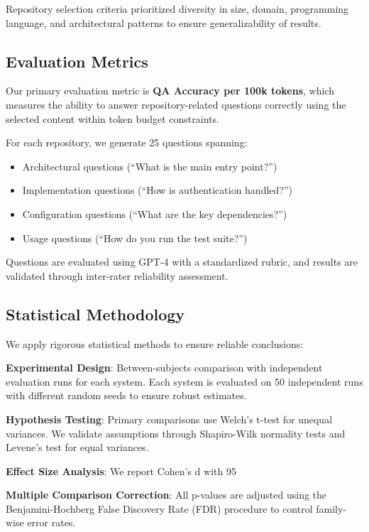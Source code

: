 \documentclass[conference]{IEEEtran}
\begin{document}
Repository selection criteria prioritized diversity in size, domain, programming language, and architectural patterns to ensure generalizability of results.

\subsection{Evaluation Metrics}

Our primary evaluation metric is \textbf{QA Accuracy per 100k tokens}, which measures the ability to answer repository-related questions correctly using the selected content within token budget constraints.

For each repository, we generate 25 questions spanning:
\begin{itemize}
\item Architectural questions (``What is the main entry point?'')
\item Implementation questions (``How is authentication handled?'')
\item Configuration questions (``What are the key dependencies?'')
\item Usage questions (``How do you run the test suite?'')
\end{itemize}

Questions are evaluated using GPT-4 with a standardized rubric, and results are validated through inter-rater reliability assessment.

\subsection{Statistical Methodology}

We apply rigorous statistical methods to ensure reliable conclusions:

\textbf{Experimental Design}: Between-subjects comparison with independent evaluation runs for each system. Each system is evaluated on 50 independent runs with different random seeds to ensure robust estimates.

\textbf{Hypothesis Testing}: Primary comparisons use Welch's t-test for unequal variances. We validate assumptions through Shapiro-Wilk normality tests and Levene's test for equal variances.

\textbf{Effect Size Analysis}: We report Cohen's d with 95%

\textbf{Multiple Comparison Correction}: All p-values are adjusted using the Benjamini-Hochberg False Discovery Rate (FDR) procedure to control family-wise error rates.
\end{document}
